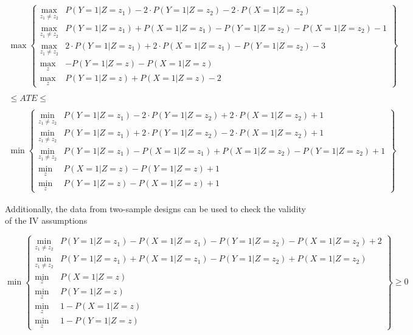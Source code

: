 \documentclass[
]{article}
\theoremstyle{plain}
\begin{document}
\begin{gather}
\max \left \{
\begin{array}{ll}
  \max_{z_1 \neq z_2} & P(Y = 1 | Z = z_1) - 2\cdot P(Y = 1 | Z = z_2) - 2\cdot P(X = 1 | Z = z_2) \\
  \max_{z_1 \neq z_2} & P(Y = 1 | Z = z_1) + P(X = 1 | Z = z_1) - P(Y = 1 | Z = z_2) - P(X = 1 | Z = z_2) - 1 \\
  \max_{z_1 \neq z_2} & 2\cdot P(Y = 1 | Z = z_1) + 2\cdot P(X = 1 | Z = z_1) - P(Y = 1 | Z = z_2) - 3 \\
  \max_z & -P(Y = 1 | Z = z) - P(X = 1 | Z = z) \\
  \max_z & P(Y = 1 | Z = z) +  P(X = 1 | Z = z) - 2
\end{array}
\right \} \nonumber \\ \nonumber \\
\le ATE \le \label{eq:ate_bound} \\ \nonumber \\
\min \left \{
\begin{array}{ll}
  \min_{z_1 \neq z_2} & P(Y = 1 | Z = z_1) - 2\cdot P(Y = 1 | Z = z_2) +  2\cdot P(X = 1 | Z = z_2) + 1 \\
  \min_{z_1 \neq z_2} & P(Y = 1 | Z = z_1) + 2\cdot P(Y = 1 | Z = z_2) -  2\cdot P(X = 1 | Z = z_2) + 1 \\
  \min_{z_1 \neq z_2} & P(Y = 1 | Z = z_1) - P(X = 1 | Z = z_1) + P(X = 1 | Z = z_2) - P(Y = 1 | Z = z_2) + 1 \\
  \min_z & P(X = 1 | Z = z) - P(Y = 1 | Z = z) + 1 \\
  \min_z & P(Y = 1 | Z = z) - P(X = 1 | Z = z) + 1 
\end{array} 
\right \} \nonumber
\end{gather}

Additionally, the data from two-sample designs can be used to check the validity of the IV assumptions

\begin{equation}
\min \left\{
  \begin{array}{ll}
    \min_{z_1 \neq z_2} & P(Y = 1 | Z = z_1) - P(X = 1 | Z = z_1) - P(Y = 1 | Z = z_2) - P(X = 1 | Z = z_2) + 2 \\
    \min_{z_1 \neq z_2} & P(Y = 1 | Z = z_1) + P(X = 1 | Z = z_1) - P(Y = 1 | Z = z_2) + P(X = 1 | Z = z_2) \\
    \min_{z} & P(X = 1 | Z = z) \\
    \min_{z} & P(Y = 1 | Z = z) \\
    \min_{z} & 1 - P(X = 1 | Z = z) \\
    \min_{z} & 1 - P(Y = 1 | Z = z) 
  \end{array} 
\right \} \ge 0 \label{eq:constraints}
\end{equation}
\end{document}

